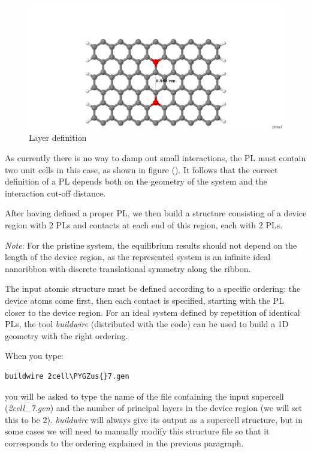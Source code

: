 \documentclass[a4paper,11pt,english]{sphinxmanual}
\def\PYGZus{\char`\_}
\begin{document}
{{\begin{figure}[htbp]
\includegraphics[width=0.800\linewidth]{4cell_7.png}
\caption{Layer definition}\label{transport:fig-4cell-7}\end{figure}

As currently there is no way to damp out small interactions, the PL
must contain two unit cells in this case, as shown in figure
{\hyperref[transport:fig-4cell-7]{\emph{}}} (). It follows that the correct definition of a PL
depends both on the geometry of the system and the interaction cut-off
distance.

After having defined a proper PL, we then build a structure consisting
of a device region with 2 PLs and contacts at each end of this region,
each with 2 PLs.

\emph{Note}: For the pristine system, the equilibrium results should not
depend on the length of the device region, as the represented system
is an infinite ideal nanoribbon with discrete translational symmetry
along the ribbon.

The input atomic structure must be defined according to a specific
ordering: the device atoms come first, then each contact is specified,
starting with the PL closer to the device region. For an ideal system
defined by repetition of identical PLs, the tool \emph{buildwire}
(distributed with the code) can be used to build a 1D geometry with
the right ordering.

When you type:

\begin{Verbatim}[commandchars=\\\{\}]
buildwire 2cell\PYGZus{}7.gen
\end{Verbatim}

you will be asked to type the name of the file containing the input
supercell (\emph{2cell\_7.gen}) and the number of principal layers in the
device region (we will set this to be 2). \emph{buildwire} will always give
its output as a supercell structure, but in some cases we will need to
manually modify this structure file so that it corresponds to the
ordering explained in the previous paragraph.

}}
\end{document}
